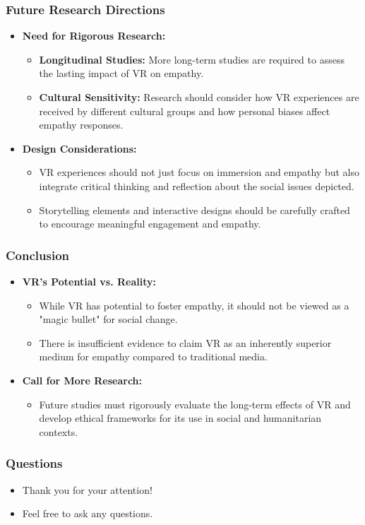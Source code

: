 \documentclass[aspectratio=169,xcolor=dvipsnames]{beamer}
\begin{document}
\begin{frame}
\frametitle{Future Research Directions}
\begin{itemize}
    \item \textbf{Need for Rigorous Research:}
    \begin{itemize}
        \item \textbf{Longitudinal Studies:} More long-term studies are required to assess the lasting impact of VR on empathy.
        \item \textbf{Cultural Sensitivity:} Research should consider how VR experiences are received by different cultural groups and how personal biases affect empathy responses.
    \end{itemize}
    \item \textbf{Design Considerations:}
    \begin{itemize}
        \item VR experiences should not just focus on immersion and empathy but also integrate critical thinking and reflection about the social issues depicted.
        \item Storytelling elements and interactive designs should be carefully crafted to encourage meaningful engagement and empathy.
    \end{itemize}
\end{itemize}
\end{frame}

\begin{frame}
\frametitle{Conclusion}
\begin{itemize}
    \item \textbf{VR’s Potential vs. Reality:}
    \begin{itemize}
        \item While VR has potential to foster empathy, it should not be viewed as a "magic bullet" for social change.
        \item There is insufficient evidence to claim VR as an inherently superior medium for empathy compared to traditional media.
    \end{itemize}
    \item \textbf{Call for More Research:}
    \begin{itemize}
        \item Future studies must rigorously evaluate the long-term effects of VR and develop ethical frameworks for its use in social and humanitarian contexts.
    \end{itemize}
\end{itemize}
\end{frame}

\begin{frame}
\frametitle{Questions}
\begin{itemize}
    \item Thank you for your attention!  
    \item Feel free to ask any questions.
\end{itemize}
\end{frame}
\end{document}
